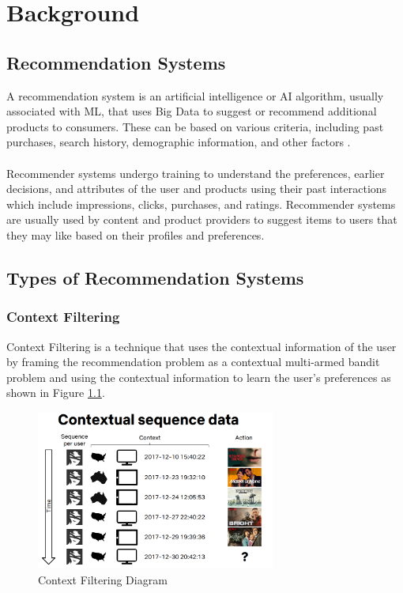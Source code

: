 \chapter{Background}
\minitoc

\section{Recommendation Systems}\label{sec:recommendation-systems}
A recommendation system is an artificial intelligence or AI algorithm, usually associated with ML, that uses Big Data to suggest or recommend additional products to consumers. These can be based on various criteria, including past purchases, search history, demographic information, and other factors \cite{NvidiaRecSys}. \\ \\
Recommender systems undergo training to understand the preferences, earlier decisions, and attributes of the user and products using their past interactions which include impressions, clicks, purchases, and ratings. Recommender systems are usually used by content and product providers to suggest items to users that they may like based on their profiles and preferences. 

\section{Types of Recommendation Systems}\label{sec:types-of-recommendation-systems}

\subsection{Context Filtering}
Context Filtering is a technique that uses the contextual information of the user by framing the recommendation problem as a contextual multi-armed bandit problem and using the contextual information to learn the user's preferences as shown in Figure \ref{fig:Context-Filtering-Diagram}.
\begin{figure}[H]
    \centering
    \includegraphics[width=0.7\textwidth]{assets/contextual-sequence-prediction.png}
    \caption[Context Filtering Diagram]{Context Filtering Diagram \cite{NvidiaRecSys}} 
    \label{fig:Context-Filtering-Diagram}
\end{figure}

